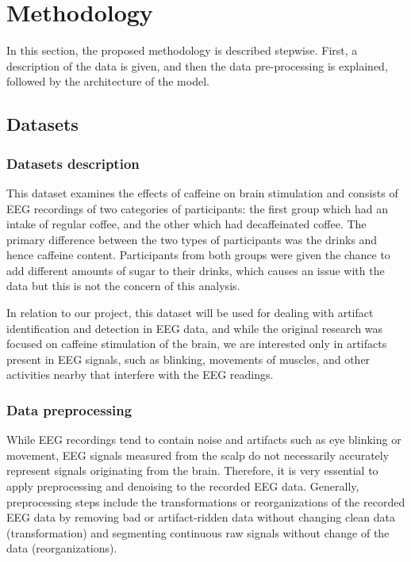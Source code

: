 \documentclass[12pt,a4paper,titlepage,openany]{report}
\begin{document}


\chapter{Methodology}
\thispagestyle{fancy}

In this section, the proposed methodology is described stepwise. First, a description of the data is given, and then the data pre-processing is explained, followed by the architecture of the model.

\section{Datasets}

\subsection{Datasets description}

This dataset examines the effects of caffeine on brain stimulation and consists of EEG recordings of two categories of participants: the first group which had an intake of regular coffee, and the other which had decaffeinated coffee. 
The primary difference between the two types of participants was the drinks and hence caffeine content. 
Participants from both groups were given the chance to add different amounts of sugar to their drinks, which causes an issue with the data but this is not the concern of this analysis.

In relation to our project, this dataset will be used for dealing with artifact identification and detection in EEG data, and while the original research was focused on caffeine stimulation of the brain, we are interested only in artifacts present in EEG signals, such as blinking, movements of muscles, and other activities nearby that interfere with the EEG readings.

\subsection{Data preprocessing}

While EEG recordings tend to contain noise and artifacts such as eye blinking or movement, EEG signals measured from the scalp do not necessarily accurately represent signals originating from the brain. 
Therefore, it is very essential to apply preprocessing and denoising to the recorded EEG data. 
Generally, preprocessing steps include the transformations or reorganizations of the recorded EEG data by removing bad or artifact-ridden data without changing clean data (transformation) and segmenting continuous raw signals without change of the data (reorganizations).
\end{document}
